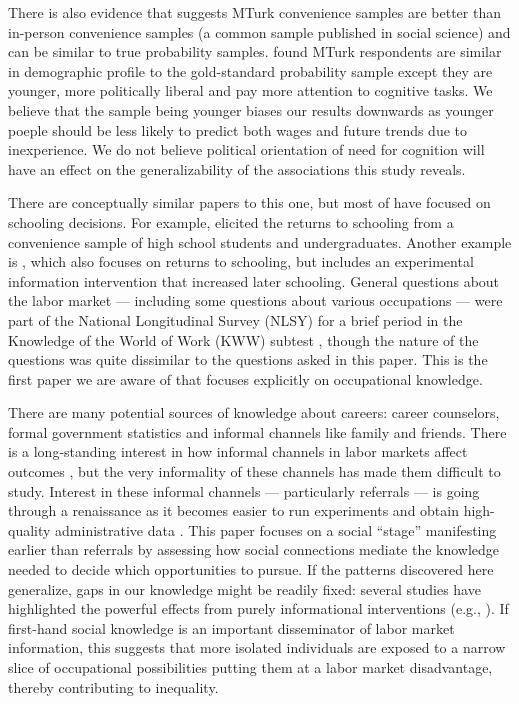 \documentclass[11pt]{article}
\begin{document}
There is also evidence that suggests MTurk convenience samples are better than in-person convenience samples (a common sample published in social science) and can be similar to true probability samples. \citet{Berinsky2012} found MTurk respondents are similar in demographic profile to the gold-standard probability sample except they are younger, more politically liberal and pay more attention to cognitive tasks. We believe that the sample being younger biases our results downwards as younger poeple should be less likely to predict both wages and future trends due to inexperience. We do not believe political orientation of need for cognition will have an effect on the generalizability of the associations this study reveals.

There are conceptually similar papers to this one, but most of have focused on schooling decisions.  
For example, \cite{dominitz1996} elicited the returns to schooling from a convenience sample of high school students and undergraduates. 
Another example is \cite{jensen2010perceived}, which also focuses on
returns to schooling, but includes an experimental information intervention that increased later schooling.   
General questions about the labor market --- including some questions about various occupations --- were part of the National Longitudinal Survey (NLSY) for a brief period in the Knowledge of the World of Work (KWW) subtest \citep{kohen1975}, though the nature of the questions was quite dissimilar to the questions asked in this paper. 
This is the first paper we are aware of that focuses explicitly on occupational knowledge.

There are many potential sources of knowledge about careers: career counselors, formal government statistics and informal channels like family and friends. 
There is a long-standing interest in how informal channels in labor markets affect outcomes \citep{rees1966information, stigler1962information}, but the very informality of these channels has made them difficult to study. 
Interest in these informal channels --- particularly referrals --- is going through a renaissance as it becomes easier to run experiments \citep{pallais2013referential} and obtain high-quality administrative data \citep{burks2013value}.   
This paper focuses on a social ``stage'' manifesting earlier than referrals by assessing how social connections mediate the knowledge needed to decide which opportunities to pursue.  
If the patterns discovered here generalize, gaps in our knowledge might be readily fixed: 
several studies have highlighted the powerful effects from purely informational interventions (e.g., \citealp{dupas2009teenagers, card2010inequality}).
If first-hand social knowledge is an important disseminator of labor market information, this suggests that more isolated individuals are exposed to a narrow slice of occupational possibilities putting them at a labor market disadvantage, thereby contributing to inequality. 
\end{document}
